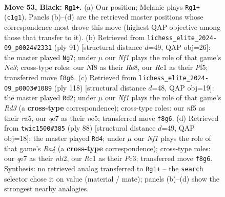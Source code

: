 \documentclass[11pt]{article}
\begin{document}
\clearpage

\begin{figure}[p]\centering
\begin{subfigure}{0.46\textwidth}\centering
\resizebox{\linewidth}{!}{%
\newchessgame
\chessboard[
  setfen={5nk1/1p2Q2p/8/5N1p/8/8/5RK1/2r5 b - - 2 53},
  showmover=false,
  pgfstyle=straightmove, color=movearrow, markmove={c1-g1}
]}
\caption{}
\end{subfigure}\hfill
\begin{subfigure}{0.46\textwidth}\centering
\resizebox{\linewidth}{!}{%
\newchessgame
\chessboard[
  setfen={4r1k1/3Q3p/4n1p1/1p3p2/8/7P/6K1/3R4 b - - 2 46},
  showmover=false,
  pgfstyle=straightmove, color=movearrow, markmove={e6-g7}
]}
\caption{}
\end{subfigure}
\\[4pt]
\begin{subfigure}{0.46\textwidth}\centering
\resizebox{\linewidth}{!}{%
\newchessgame
\chessboard[
  setfen={8/2N1k3/4P1p1/r3n3/8/3R3P/4K3/8 w - - 6 60},
  showmover=false,
  pgfstyle=straightmove, color=movearrow, markmove={d3-d2}
]}
\caption{}
\end{subfigure}\hfill
\begin{subfigure}{0.46\textwidth}\centering
\resizebox{\linewidth}{!}{%
\newchessgame
\chessboard[
  setfen={8/2p2kr1/1p6/8/R7/P1P3NP/1n5K/8 w - - 0 45},
  showmover=false,
  pgfstyle=straightmove, color=movearrow, markmove={a4-d4}
]}
\caption{}
\end{subfigure}
\caption{\textbf{Move 53, Black: \texttt{Rg1+}.} (a) Our position; Melanie plays \texttt{Rg1+} (\texttt{c1g1}). Panels (b)--(d) are the retrieved master positions whose correspondence most drove this move (highest QAP objective among those that transfer to it). (b) Retrieved from \texttt{lichess\_elite\_2024-09\_p0024\#2331} (ply 91) [structural distance $d$=49, QAP obj=26]: the master played \texttt{Ng7}; under $\mu$ our \emph{Nf1} plays the role of that game's \emph{Ne3}; cross-type roles: our \emph{N}f8 as their \emph{R}e8, our \emph{R}c1 as their \emph{P}f5; transferred move \texttt{f8g6}. (c) Retrieved from \texttt{lichess\_elite\_2024-09\_p0003\#1089} (ply 118) [structural distance $d$=48, QAP obj=19]: the master played \texttt{Rd2}; under $\mu$ our \emph{Nf1} plays the role of that game's \emph{Rd3} (a \textbf{cross-type} correspondence); cross-type roles: our \emph{n}f5 as their \emph{r}a5, our \emph{q}e7 as their \emph{n}e5; transferred move \texttt{f8g6}. (d) Retrieved from \texttt{twic1500\#385} (ply 88) [structural distance $d$=49, QAP obj=18]: the master played \texttt{Rd4}; under $\mu$ our \emph{Nf1} plays the role of that game's \emph{Ra4} (a \textbf{cross-type} correspondence); cross-type roles: our \emph{q}e7 as their \emph{n}b2, our \emph{R}c1 as their \emph{P}c3; transferred move \texttt{f8g6}. Synthesis: no retrieved analog transferred to \texttt{Rg1+} -- the \texttt{search} selector chose it on value (material / mate); panels (b)--(d) show the strongest nearby analogies.}
\label{fig:thought-m105}
\end{figure}
\end{document}

